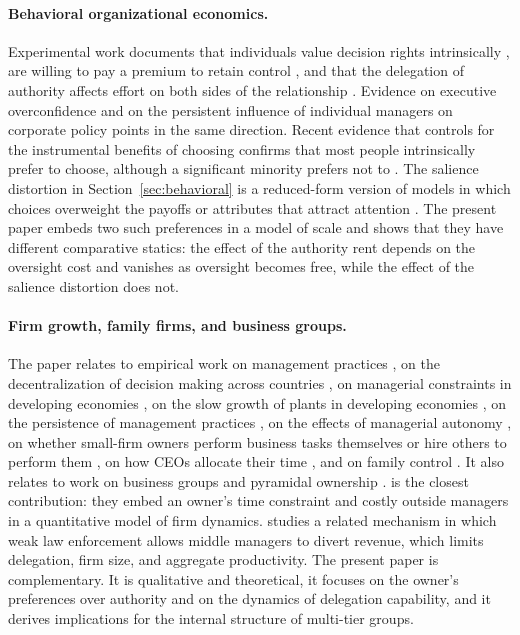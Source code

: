 \documentclass[11pt,a4paper]{article}
\theoremstyle{plain}
\begin{document}
\paragraph{Behavioral organizational economics.} Experimental work documents that individuals value decision rights intrinsically \citep{bartling2014}, are willing to pay a premium to retain control \citep{owens2014,bobadilla2017}, and that the delegation of authority affects effort on both sides of the relationship \citep{fehr2013}. Evidence on executive overconfidence \citep{malmendier2005} and on the persistent influence of individual managers on corporate policy \citep{bertrand2003} points in the same direction. Recent evidence that controls for the instrumental benefits of choosing confirms that most people intrinsically prefer to choose, although a significant minority prefers not to \citep{freundt2026}. The salience distortion in Section~\ref{sec:behavioral} is a reduced-form version of models in which choices overweight the payoffs or attributes that attract attention \citep{bordalo2012,koszegi2013}. The present paper embeds two such preferences in a model of scale and shows that they have different comparative statics: the effect of the authority rent depends on the oversight cost and vanishes as oversight becomes free, while the effect of the salience distortion does not.

\paragraph{Firm growth, family firms, and business groups.} The paper relates to empirical work on management practices \citep{bloom2007}, on the decentralization of decision making across countries \citep{bloom2012}, on managerial constraints in developing economies \citep{bloom2013,akcigit2021}, on the slow growth of plants in developing economies \citep{hsieh2014}, on the persistence of management practices \citep{bloom2020}, on the effects of managerial autonomy \citep{kala2024}, on whether small-firm owners perform business tasks themselves or hire others to perform them \citep{anderson2022}, on how CEOs allocate their time \citep{bandiera2018,bandiera2020}, and on family control \citep{bennedsen2007,bertrand2008}. It also relates to work on business groups and pyramidal ownership \citep{khanna2007,almeida2006}. \citet{akcigit2021} is the closest contribution: they embed an owner's time constraint and costly outside managers in a quantitative model of firm dynamics. \citet{grobovsek2020} studies a related mechanism in which weak law enforcement allows middle managers to divert revenue, which limits delegation, firm size, and aggregate productivity. The present paper is complementary. It is qualitative and theoretical, it focuses on the owner's preferences over authority and on the dynamics of delegation capability, and it derives implications for the internal structure of multi-tier groups.
\end{document}

